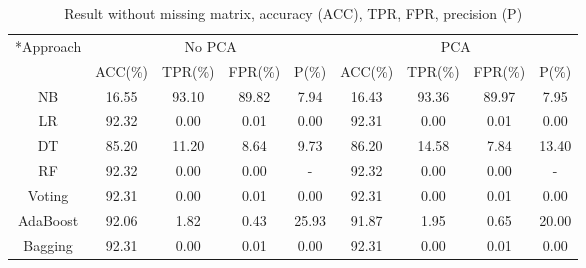 \documentclass{article}
\def\abovestrut#1{\rule[0in]{0in}{#1}\ignorespaces}
\def\belowstrut#1{\rule[-#1]{0in}{#1}\ignorespaces}
\def\abovespace{\abovestrut{0.20in}}
\def\belowspace{\belowstrut{0.10in}}
\begin{document}
\begin{table}[htbp]
\begin{center}
\begin{small}
\begin{sc}
\begin{tabular}{c|cccc|cccc}
\hline
\hline
\abovespace\belowspace
\multirow{2}*{Approach} & \multicolumn{4}{c|}{No PCA} & \multicolumn{4}{c}{PCA} \\ \cline{2-9}
\abovespace\belowspace
 & ACC(\%) & TPR(\%) & FPR(\%) & P(\%) & ACC(\%) & TPR(\%) & FPR(\%) & P(\%) \\
\hline
\abovespace
NB & 16.55 & 93.10 & 89.82 & 7.94 & 16.43 & 93.36 & 89.97 & 7.95 \\
LR & 92.32 & 0.00 & 0.01 & 0.00 & 92.31 & 0.00 & 0.01 & 0.00 \\
DT & 85.20 & 11.20 & 8.64 & 9.73 & 86.20 & 14.58 & 7.84 & 13.40 \\
RF & 92.32 & 0.00 & 0.00 & - & 92.32 & 0.00 & 0.00 & - \\
Voting & 92.31 & 0.00 & 0.01 & 0.00 & 92.31 & 0.00 & 0.01 & 0.00 \\
AdaBoost & 92.06 & 1.82 & 0.43 & 25.93 & 91.87 & 1.95 & 0.65 & 20.00 \\
\belowspace
Bagging & 92.31 & 0.00 & 0.01 & 0.00 & 92.31 & 0.00 & 0.01 & 0.00 \\
\hline
\hline
\end{tabular}
\end{sc}
\end{small}
\newline
\caption{Result without missing matrix, accuracy (ACC), TPR, FPR, precision (P)}
\label{tab:result_nomiss}
\end{center}
\vskip -3mm
\end{table}
\end{document}
